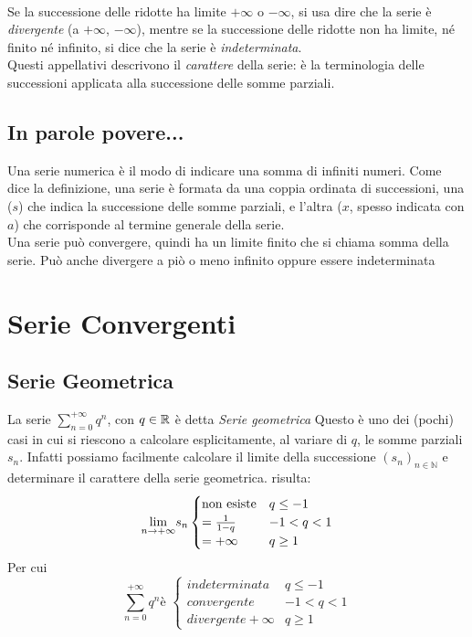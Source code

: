 \documentclass[12pt, a4paper, openany]{book}
\begin{document}
	\paragraph*{}Se la successione delle ridotte ha limite $+ \infty$ o $- \infty$, si usa dire che la serie è \emph{divergente} (a $+ \infty$, $- \infty$), mentre se la successione delle ridotte non ha limite, né finito né infinito, si dice che la serie è \emph{indeterminata}.
	\\Questi appellativi descrivono il \emph{carattere} della serie: è  la terminologia delle successioni applicata alla successione delle somme parziali.

	\subsection*{In parole povere...}
	Una serie numerica è il modo di indicare una somma di infiniti numeri.
	Come dice la definizione, una serie è formata da una coppia ordinata di successioni, una ($s$) che indica la successione delle somme parziali, e l'altra ($x$, spesso indicata con $a$) che corrisponde al termine generale della serie.
	\\Una serie può convergere, quindi ha un limite finito che si chiama somma della serie. Può anche divergere a piò o meno infinito oppure essere indeterminata


	\section{Serie Convergenti}
	\subsection{Serie Geometrica}
	La serie $\sum_{n=0}^{+\infty} q^n$, con $q \in \mathbb{R}$ è detta \emph{Serie geometrica}
	Questo è uno dei (pochi) casi in cui si riescono a calcolare esplicitamente, al variare di $q$, le somme parziali $s_n$.
	Infatti possiamo facilmente calcolare il limite della successione $(s_n)_{n\in \mathbb{N}}$ e determinare il carattere della serie geometrica.
	risulta:
	\begin{equation}
		\underset{n \to +\infty}{\lim} s_n \begin{cases}
			\text{non esiste} & q \leq -1  \\
			= \frac{1}{1-q}   & -1 < q < 1 \\
			= +\infty         & q \geq 1
		\end{cases}
	\end{equation}
	Per cui
	\begin{equation}
		\sum_{n=0}^{+\infty} q^n \text{è } \begin{cases}
			indeterminata      & q \leq -1  \\
			convergente        & -1 < q < 1 \\
			divergente +\infty & q \geq 1
		\end{cases}
	\end{equation}
\end{document}
